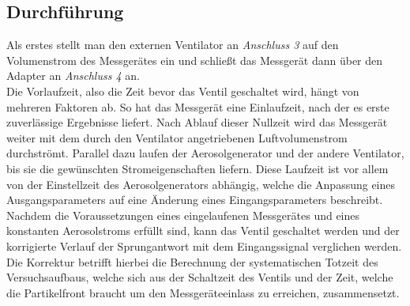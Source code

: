\subsection{Durchf\"{u}hrung}
Als erstes stellt man den externen Ventilator an \textit{Anschluss 3} auf den Volumenstrom des Messger\"{a}tes ein und schlie{\ss}t das Messger\"{a}t dann \"{u}ber den Adapter an \textit{Anschluss 4} an.\\
Die Vorlaufzeit, also die Zeit bevor das Ventil geschaltet wird, h\"{a}ngt von mehreren Faktoren ab. So hat das Messger\"{a}t eine Einlaufzeit, nach der es erste zuverl\"{a}ssige Ergebnisse liefert. Nach Ablauf dieser Nullzeit wird das Messger\"{a}t weiter mit dem durch den Ventilator angetriebenen Luftvolumenstrom durchstr\"{o}mt. Parallel dazu laufen der Aerosolgenerator und der andere Ventilator, bis sie die gew\"{u}nschten Stromeigenschaften liefern. Diese Laufzeit ist vor allem von der Einstellzeit des Aerosolgenerators abh\"{a}ngig, welche die Anpassung eines Ausgangsparameters auf eine \"{A}nderung eines Eingangsparameters beschreibt. Nachdem die Voraussetzungen eines eingelaufenen Messger\"{a}tes und eines konstanten Aerosolstroms erf\"{u}llt sind, kann das Ventil geschaltet werden und der korrigierte Verlauf der Sprungantwort mit dem Eingangssignal verglichen werden. Die Korrektur betrifft hierbei die Berechnung der systematischen Totzeit des Versuchsaufbaus, welche sich aus der Schaltzeit des Ventils und der Zeit, welche die Partikelfront braucht um den Messger\"{a}teeinlass zu erreichen, zusammensetzt.

